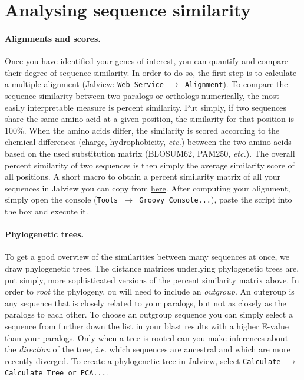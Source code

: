 \documentclass[11pt]{article}
\begin{document}
	\section{Analysing sequence similarity\label{sec:phylo}}
	
	\paragraph*{Alignments and scores.} Once you have identified your genes of interest, you can quantify and compare their degree of sequence similarity.
	In order to do so, the first step is to calculate a multiple alignment (Jalview: \texttt{Web Service $\rightarrow$ Alignment}).
	To compare the sequence similarity between two paralogs or orthologs numerically, the most easily interpretable measure is percent similarity. 
	Put simply, if two sequences share the same amino acid at a given position, the similarity for that position is 100\%. 
	When the amino acids differ, the similarity is scored according to the chemical differences (charge, hydrophobicity, \textit{etc.}) between the two amino acids based on the used substitution matrix (BLOSUM62, PAM250, \textit{etc.}). 
	The overall percent similarity of two sequences is then simply the average similarity score of all positions. 
	A short macro to obtain a percent similarity matrix of all your sequences in Jalview you can copy from \href{https://github.com/leonardblaschek/teaching/blob/master/bioinformatics/jalview_simmat.txt}{here}. 
	After computing your alignment, simply open the console (\texttt{Tools $\rightarrow$ Groovy Console...}), paste the script into the box and execute it.
	
	\paragraph*{Phylogenetic trees.}To get a good overview of the similarities between many sequences at once, we draw phylogenetic trees. The distance matrices underlying phylogenetic trees are, put simply, more sophisticated versions of the percent similarity matrix above. In order to \textit{root} the phylogeny, ou will need to include an \textit{outgroup}. An outgroup is any sequence that is closely related to your paralogs, but not as closely as the paralogs to each other. To choose an outgroup sequence you can simply select a sequence from further down the list in your blast results with a higher E-value than your paralogs. Only when a tree is rooted can you make inferences about the \href{https://evolution.berkeley.edu/evolibrary/article/evo_05}{\textit{direction}} of the tree, \textit{i.e.} which sequences are ancestral and which are more recently diverged. To create a phylogenetic tree in Jalview, select \texttt{Calculate $\rightarrow$ Calculate Tree or PCA...}.
	
\end{document}
